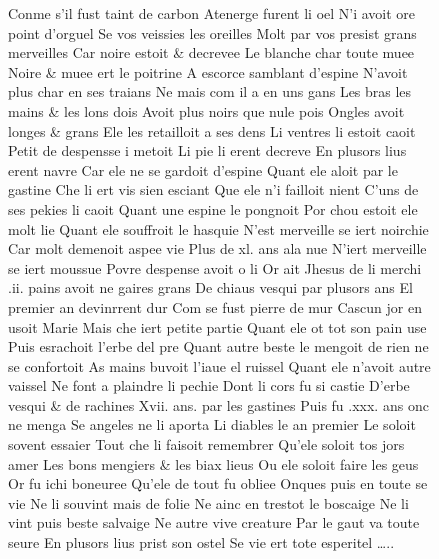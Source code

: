 \documentclass[
  letterpaper,
  DIV=11,
  numbers=noendperiod,
  oneside]{scrreprt}
\begin{document}
\begin{figure}
Conme s'il fust taint de carbon Atenerge furent li oel N'i avoit ore
point d'orguel Se vos veissies les oreilles Molt par vos presist grans
merveilles Car noire estoit \& decrevee Le blanche char toute muee Noire
\& muee ert le poitrine A escorce samblant d'espine N'avoit plus char en
ses traians Ne mais com il a en uns gans Les bras les mains \& les lons
dois Avoit plus noirs que nule pois Ongles avoit longes \& grans Ele les
retailloit a ses dens Li ventres li estoit caoit Petit de despensse i
metoit Li pie li erent decreve En plusors lius erent navre Car ele ne se
gardoit d'espine Quant ele aloit par le gastine Che li ert vis sien
esciant Que ele n'i failloit nient C'uns de ses pekies li caoit Quant
une espine le pongnoit Por chou estoit ele molt lie Quant ele souffroit
le hasquie N'est merveille se iert noirchie Car molt demenoit aspee vie
Plus de xl. ans ala nue N'iert merveille se iert moussue Povre despense
avoit o li Or ait Jhesus de li merchi .ii. pains avoit ne gaires grans
De chiaus vesqui par plusors ans El premier an devinrrent dur Com se
fust pierre de mur Cascun jor en usoit Marie Mais che iert petite partie
Quant ele ot tot son pain use Puis esrachoit l'erbe del pre Quant autre
beste le mengoit de rien ne se confortoit As mains buvoit l'iaue el
ruissel Quant ele n'avoit autre vaissel Ne font a plaindre li pechie
Dont li cors fu si castie D'erbe vesqui \& de rachines Xvii. ans. par
les gastines Puis fu .xxx. ans onc ne menga Se angeles ne li aporta Li
diables le an premier Le soloit sovent essaier Tout che li faisoit
remembrer Qu'ele soloit tos jors amer Les bons mengiers \& les biax
lieus Ou ele soloit faire les geus Or fu ichi boneuree Qu'ele de tout fu
obliee Onques puis en toute se vie Ne li souvint mais de folie Ne ainc
en trestot le boscaige Ne li vint puis beste salvaige Ne autre vive
creature Par le gaut va toute seure En plusors lius prist son ostel Se
vie ert tote esperitel \ldots..


\end{figure}
\end{document}

